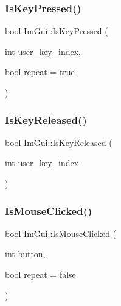 \hypertarget{namespace_im_gui_a83331a8afa5316bc98ed9c98b151ac01}{}\label{namespace_im_gui_a83331a8afa5316bc98ed9c98b151ac01} 
\subsubsection{\texorpdfstring{Is\+Key\+Pressed()}{IsKeyPressed()}}
{\footnotesize\ttfamily bool Im\+Gui\+::\+Is\+Key\+Pressed (\begin{DoxyParamCaption}\item[{int}]{user\+\_\+key\+\_\+index,  }\item[{bool}]{repeat = {\ttfamily true} }\end{DoxyParamCaption})}

\hypertarget{namespace_im_gui_a3fb25247181c5c292fe4f932bd20de88}{}\label{namespace_im_gui_a3fb25247181c5c292fe4f932bd20de88} 
\subsubsection{\texorpdfstring{Is\+Key\+Released()}{IsKeyReleased()}}
{\footnotesize\ttfamily bool Im\+Gui\+::\+Is\+Key\+Released (\begin{DoxyParamCaption}\item[{int}]{user\+\_\+key\+\_\+index }\end{DoxyParamCaption})}

\hypertarget{namespace_im_gui_a22b689cf4cf519590c2e2ad4f5462f29}{}\label{namespace_im_gui_a22b689cf4cf519590c2e2ad4f5462f29} 
\subsubsection{\texorpdfstring{Is\+Mouse\+Clicked()}{IsMouseClicked()}}
{\footnotesize\ttfamily bool Im\+Gui\+::\+Is\+Mouse\+Clicked (\begin{DoxyParamCaption}\item[{int}]{button,  }\item[{bool}]{repeat = {\ttfamily false} }\end{DoxyParamCaption})}

\hypertarget{namespace_im_gui_a0d39701e7a0d7629e1b96b68e935542e}{}\label{namespace_im_gui_a0d39701e7a0d7629e1b96b68e935542e} 
